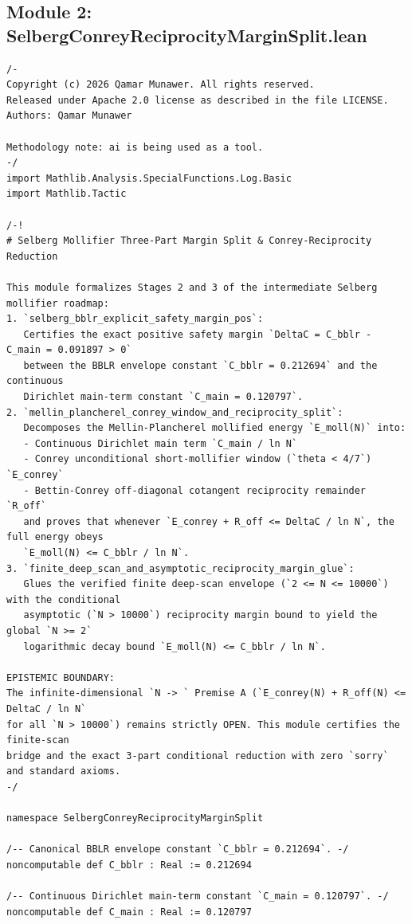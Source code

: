 \documentclass[11pt,a4paper]{article}
\begin{document}
\subsection{Module 2: SelbergConreyReciprocityMarginSplit.lean}
\begin{lstlisting}[language=Lean4]
/-
Copyright (c) 2026 Qamar Munawer. All rights reserved.
Released under Apache 2.0 license as described in the file LICENSE.
Authors: Qamar Munawer

Methodology note: ai is being used as a tool.
-/
import Mathlib.Analysis.SpecialFunctions.Log.Basic
import Mathlib.Tactic

/-!
# Selberg Mollifier Three-Part Margin Split & Conrey-Reciprocity Reduction

This module formalizes Stages 2 and 3 of the intermediate Selberg mollifier roadmap:
1. `selberg_bblr_explicit_safety_margin_pos`:
   Certifies the exact positive safety margin `DeltaC = C_bblr - C_main = 0.091897 > 0`
   between the BBLR envelope constant `C_bblr = 0.212694` and the continuous
   Dirichlet main-term constant `C_main = 0.120797`.
2. `mellin_plancherel_conrey_window_and_reciprocity_split`:
   Decomposes the Mellin-Plancherel mollified energy `E_moll(N)` into:
   - Continuous Dirichlet main term `C_main / ln N`
   - Conrey unconditional short-mollifier window (`theta < 4/7`) `E_conrey`
   - Bettin-Conrey off-diagonal cotangent reciprocity remainder `R_off`
   and proves that whenever `E_conrey + R_off <= DeltaC / ln N`, the full energy obeys
   `E_moll(N) <= C_bblr / ln N`.
3. `finite_deep_scan_and_asymptotic_reciprocity_margin_glue`:
   Glues the verified finite deep-scan envelope (`2 <= N <= 10000`) with the conditional
   asymptotic (`N > 10000`) reciprocity margin bound to yield the global `N >= 2`
   logarithmic decay bound `E_moll(N) <= C_bblr / ln N`.

EPISTEMIC BOUNDARY:
The infinite-dimensional `N -> ` Premise A (`E_conrey(N) + R_off(N) <= DeltaC / ln N`
for all `N > 10000`) remains strictly OPEN. This module certifies the finite-scan
bridge and the exact 3-part conditional reduction with zero `sorry` and standard axioms.
-/

namespace SelbergConreyReciprocityMarginSplit

/-- Canonical BBLR envelope constant `C_bblr = 0.212694`. -/
noncomputable def C_bblr : Real := 0.212694

/-- Continuous Dirichlet main-term constant `C_main = 0.120797`. -/
noncomputable def C_main : Real := 0.120797


\end{lstlisting}
\end{document}
